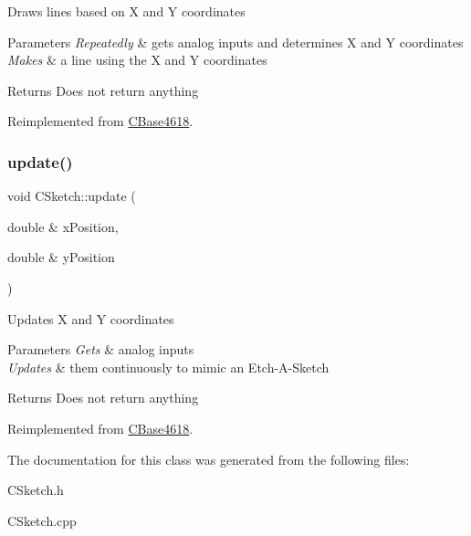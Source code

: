 Draws lines based on X and Y coordinates


\begin{DoxyParams}{Parameters}
{\em Repeatedly} & gets analog inputs and determines X and Y coordinates \\
\hline
{\em Makes} & a line using the X and Y coordinates\\
\hline
\end{DoxyParams}
\begin{DoxyReturn}{Returns}
Does not return anything 
\end{DoxyReturn}


Reimplemented from \hyperlink{class_c_base4618_aa4e8190003db02c98e7e6bdcfdf0ee1a}{C\+Base4618}.

\hypertarget{class_c_sketch_a81582a1c6eb7524db76546565412a88b}{}\label{class_c_sketch_a81582a1c6eb7524db76546565412a88b} 
\subsubsection{\texorpdfstring{update()}{update()}}
{\footnotesize\ttfamily void C\+Sketch\+::update (\begin{DoxyParamCaption}\item[{double \&}]{x\+Position,  }\item[{double \&}]{y\+Position }\end{DoxyParamCaption})\hspace{0.3cm}{\ttfamily [virtual]}}

Updates X and Y coordinates


\begin{DoxyParams}{Parameters}
{\em Gets} & analog inputs \\
\hline
{\em Updates} & them continuously to mimic an Etch-\/\+A-\/\+Sketch\\
\hline
\end{DoxyParams}
\begin{DoxyReturn}{Returns}
Does not return anything 
\end{DoxyReturn}


Reimplemented from \hyperlink{class_c_base4618_a46e2ad109d3c7c877d00cff9093736c7}{C\+Base4618}.



The documentation for this class was generated from the following files\+:\begin{DoxyCompactItemize}
\item 
C\+Sketch.\+h\item 
C\+Sketch.\+cpp\end{DoxyCompactItemize}
